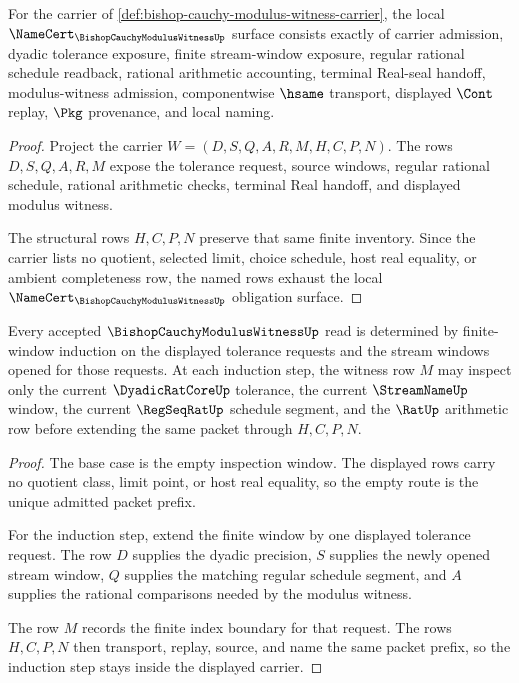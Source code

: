 \begin{theorem}
\label{thm:bishop-cauchy-modulus-witness-obligation-surface}
For the carrier of \autoref{def:bishop-cauchy-modulus-witness-carrier}, the local $\NameCert_{\BishopCauchyModulusWitnessUp}$ surface consists exactly of carrier admission, dyadic tolerance exposure, finite stream-window exposure, regular rational schedule readback, rational arithmetic accounting, terminal Real-seal handoff, modulus-witness admission, componentwise $\hsame$ transport, displayed $\Cont$ replay, $\Pkg$ provenance, and local naming.
\end{theorem}
\begin{proof}
Project the carrier $W=(D,S,Q,A,R,M,H,C,P,N)$. The rows $D,S,Q,A,R,M$ expose the tolerance request, source windows, regular rational schedule, rational arithmetic checks, terminal Real handoff, and displayed modulus witness.

The structural rows $H,C,P,N$ preserve that same finite inventory. Since the carrier lists no quotient, selected limit, choice schedule, host real equality, or ambient completeness row, the named rows exhaust the local $\NameCert_{\BishopCauchyModulusWitnessUp}$ obligation surface.
\end{proof}

\begin{theorem}
\label{thm:bishop-cauchy-modulus-witness-induction}
Every accepted $\BishopCauchyModulusWitnessUp$ read is determined by finite-window induction on the displayed tolerance requests and the stream windows opened for those requests. At each induction step, the witness row $M$ may inspect only the current $\DyadicRatCoreUp$ tolerance, the current $\StreamNameUp$ window, the current $\RegSeqRatUp$ schedule segment, and the $\RatUp$ arithmetic row before extending the same packet through $H,C,P,N$.
\end{theorem}
\begin{proof}
The base case is the empty inspection window. The displayed rows carry no quotient class, limit point, or host real equality, so the empty route is the unique admitted packet prefix.

For the induction step, extend the finite window by one displayed tolerance request. The row $D$ supplies the dyadic precision, $S$ supplies the newly opened stream window, $Q$ supplies the matching regular schedule segment, and $A$ supplies the rational comparisons needed by the modulus witness.

The row $M$ records the finite index boundary for that request. The rows $H,C,P,N$ then transport, replay, source, and name the same packet prefix, so the induction step stays inside the displayed carrier.
\end{proof}

